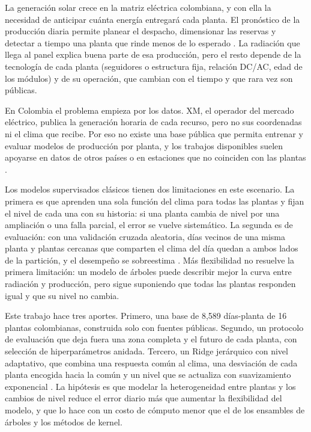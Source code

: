 \documentclass[pdflatex,sn-mathphys-num]{sn-jnl}
\begin{document}
La generación solar crece en la matriz eléctrica colombiana, y con ella la necesidad de anticipar cuánta energía entregará cada planta. El pronóstico de la producción diaria permite planear el despacho, dimensionar las reservas y detectar a tiempo una planta que rinde menos de lo esperado \cite{antonanzas2016review}. La radiación que llega al panel explica buena parte de esa producción, pero el resto depende de la tecnología de cada planta (seguidores o estructura fija, relación DC/AC, edad de los módulos) y de su operación, que cambian con el tiempo y que rara vez son públicas.

En Colombia el problema empieza por los datos. XM, el operador del mercado eléctrico, publica la generación horaria de cada recurso, pero no sus coordenadas ni el clima que recibe. Por eso no existe una base pública que permita entrenar y evaluar modelos de producción por planta, y los trabajos disponibles suelen apoyarse en datos de otros países o en estaciones que no coinciden con las plantas \cite{antonanzas2016review}.

Los modelos supervisados clásicos tienen dos limitaciones en este escenario. La primera es que aprenden una sola función del clima para todas las plantas y fijan el nivel de cada una con su historia: si una planta cambia de nivel por una ampliación o una falla parcial, el error se vuelve sistemático. La segunda es de evaluación: con una validación cruzada aleatoria, días vecinos de una misma planta y plantas cercanas que comparten el clima del día quedan a ambos lados de la partición, y el desempeño se sobreestima \cite{roberts2017cv,kaufman2012leakage}. Más flexibilidad no resuelve la primera limitación: un modelo de árboles puede describir mejor la curva entre radiación y producción, pero sigue suponiendo que todas las plantas responden igual y que su nivel no cambia.

Este trabajo hace tres aportes. Primero, una base de 8,589 días-planta de 16 plantas colombianas, construida solo con fuentes públicas. Segundo, un protocolo de evaluación que deja fuera una zona completa y el futuro de cada planta, con selección de hiperparámetros anidada. Tercero, un Ridge jerárquico con nivel adaptativo, que combina una respuesta común al clima, una desviación de cada planta encogida hacia la común \cite{gelman2007multilevel} y un nivel que se actualiza con suavizamiento exponencial \cite{gardner1985exponential}. La hipótesis es que modelar la heterogeneidad entre plantas y los cambios de nivel reduce el error diario más que aumentar la flexibilidad del modelo, y que lo hace con un costo de cómputo menor que el de los ensambles de árboles y los métodos de kernel.
\end{document}
